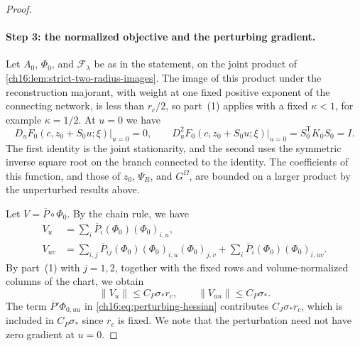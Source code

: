 \begin{proof}
\paragraph{Step 3: the normalized objective and the perturbing gradient.}
Let $A_0$, $\Phi_0$, and $\mathcal F_\lambda$ be as in the statement, on the joint product of \cref{ch16:lem:strict-two-radius-images}. The image of this product under the reconstruction majorant, with weight at one fixed positive exponent of the connecting network, is less than $r_c/2$, so part~(1) applies with a fixed $\kappa<1$, for example $\kappa=1/2$. At $u=0$ we have
\begin{equation}\label{ch16:eq:unit-joint-hessian}
 D_uF_0(c,z_0+S_0u;\xi)\big|_{u=0}=0,\qquad
 D_u^2F_0(c,z_0+S_0u;\xi)\big|_{u=0}
                         =S_0^{\mathsf T}K_0S_0=I.
\end{equation}
The first identity is the joint stationarity, and the second uses the symmetric inverse square root on the branch connected to the identity. The coefficients of this function, and those of $z_0$, $\Psi_R$, and $G^\Omega$, are bounded on a larger product by the unperturbed results above.

Let $V=\overline P\circ\Phi_0$. By the chain rule, we have
\begin{align}
 V_u&=\sum_i\overline P_i(\Phi_0)(\Phi_0)_{i,u},
                                                        \label{ch16:eq:perturbing-force}\\
 V_{uv}&=\sum_{i,j}\overline P_{ij}(\Phi_0)
                   (\Phi_0)_{i,u}(\Phi_0)_{j,v}
                +\sum_i\overline P_i(\Phi_0)(\Phi_0)_{i,uv}.
                                                        \label{ch16:eq:perturbing-hessian}
\end{align}
By part~(1) with $j=1,2$, together with the fixed rows and volume-normalized columns of the chart, we obtain
\begin{equation}\label{ch16:eq:perturbing-bounds}
 \|V_u\|\le C_P\sigma_*r_c,\qquad
 \|V_{uu}\|\le C_P\sigma_*.
\end{equation}
The term $\overline P'\Phi_{0,uu}$ in \eqref{ch16:eq:perturbing-hessian} contributes $C_J\sigma_*r_c$, which is included in $C_P\sigma_*$ since $r_c$ is fixed. We note that the perturbation need not have zero gradient at $u=0$.


\end{proof}
